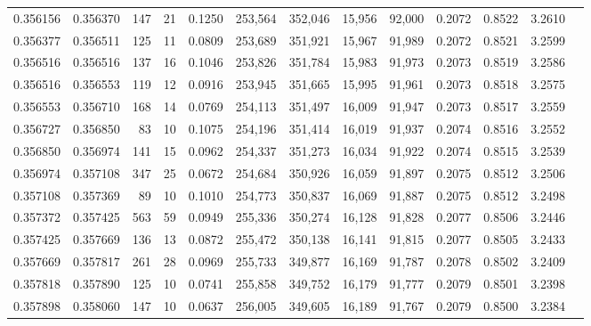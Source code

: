 \begin{tabular}{rrrrrrrrrrrrr}
0.356156 & 0.356370 &   147 &  21 &                                     0.1250 & 253,564 & 352,046 &  15,956 &  92,000 & 0.2072 & 0.8522 & 3.2610 \\
0.356377 & 0.356511 &   125 &  11 &                                     0.0809 & 253,689 & 351,921 &  15,967 &  91,989 & 0.2072 & 0.8521 & 3.2599 \\
0.356516 & 0.356516 &   137 &  16 &                                     0.1046 & 253,826 & 351,784 &  15,983 &  91,973 & 0.2073 & 0.8519 & 3.2586 \\
0.356516 & 0.356553 &   119 &  12 &                                     0.0916 & 253,945 & 351,665 &  15,995 &  91,961 & 0.2073 & 0.8518 & 3.2575 \\
0.356553 & 0.356710 &   168 &  14 &                                     0.0769 & 254,113 & 351,497 &  16,009 &  91,947 & 0.2073 & 0.8517 & 3.2559 \\
0.356727 & 0.356850 &    83 &  10 &                                     0.1075 & 254,196 & 351,414 &  16,019 &  91,937 & 0.2074 & 0.8516 & 3.2552 \\
0.356850 & 0.356974 &   141 &  15 &                                     0.0962 & 254,337 & 351,273 &  16,034 &  91,922 & 0.2074 & 0.8515 & 3.2539 \\
0.356974 & 0.357108 &   347 &  25 &                                     0.0672 & 254,684 & 350,926 &  16,059 &  91,897 & 0.2075 & 0.8512 & 3.2506 \\
0.357108 & 0.357369 &    89 &  10 &                                     0.1010 & 254,773 & 350,837 &  16,069 &  91,887 & 0.2075 & 0.8512 & 3.2498 \\
0.357372 & 0.357425 &   563 &  59 &                                     0.0949 & 255,336 & 350,274 &  16,128 &  91,828 & 0.2077 & 0.8506 & 3.2446 \\
0.357425 & 0.357669 &   136 &  13 &                                     0.0872 & 255,472 & 350,138 &  16,141 &  91,815 & 0.2077 & 0.8505 & 3.2433 \\
0.357669 & 0.357817 &   261 &  28 &                                     0.0969 & 255,733 & 349,877 &  16,169 &  91,787 & 0.2078 & 0.8502 & 3.2409 \\
0.357818 & 0.357890 &   125 &  10 &                                     0.0741 & 255,858 & 349,752 &  16,179 &  91,777 & 0.2079 & 0.8501 & 3.2398 \\
0.357898 & 0.358060 &   147 &  10 &                                     0.0637 & 256,005 & 349,605 &  16,189 &  91,767 & 0.2079 & 0.8500 & 3.2384 \\

\end{tabular}
